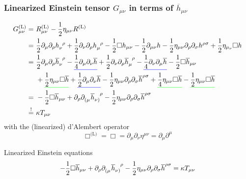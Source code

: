 \subsubsection{Linearized Einstein tensor \texorpdfstring{$G_{\mu\nu}$}{Gmunu} in terms of \texorpdfstring{$\overline{h}_{\mu\nu}$}{hbarmunu}}

\begin{equation}
    \begin{split}
        G_{\mu\nu}^{\text{(L)}} =\ & R_{\mu\nu}^{\text{(L)}} - \frac{1}{2} \eta_{\mu\nu} R^{\text{(L)}} \\
        =\ & \frac{1}{2} \partial_\mu \partial_\rho \tensor{h}{_\nu^\rho} + \frac{1}{2} \partial_\nu \partial_\rho \tensor{h}{_\mu^\rho}
        - \frac{1}{2} \Box h_{\mu\nu} - \frac{1}{2} \partial_{\mu\nu}h-\frac{1}{2} \eta_{\mu\nu}\partial_\rho\partial_\sigma h^{\rho\sigma}
        + \frac{1}{2} \eta_{\mu_\nu}\Box h \\
        =\ & \frac{1}{2} \partial_\mu\partial_\rho \tensor{\overline{h}}{_\nu^\rho}
        - \mathunderline{blue}{\frac{1}{4}\partial_\mu\partial_\nu\overline{h}}
        + \frac{1}{2} \partial_\nu\partial_\rho\tensor{\overline{h}}{_\mu^\rho}
        - \mathunderline{blue}{\frac{1}{4}\partial_\nu\partial_\mu\overline{h}} - \frac{1}{2}\Box\overline{h}_{\mu\nu} \\
        & + \mathunderline{green}{\frac{1}{2}\eta_{\mu\nu}\Box\overline{h}} + \mathunderline{blue}{\frac{1}{2}\partial_\mu\partial_\nu\overline{h}}
        - \frac{1}{2}\eta_{\mu\nu}\partial_\rho\partial_\sigma\overline{h}^{\rho\sigma}
        + \mathunderline{green}{\frac{1}{4}\eta_{\mu\nu}\Box\overline{h}} - \mathunderline{green}{\frac{1}{2}\eta_{\mu\nu}\Box\overline{h}} \\
        =\ & -\frac{1}{2} \Box \overline{h}_{\mu\nu} + \partial_\rho \tensor{\partial}{_(_\mu}\tensor{\overline{h}}{_\nu_)^\rho}
        - \frac{1}{2} \eta_{\mu\nu}\partial_\rho\partial_\sigma \overline{h}^{\rho\sigma} \\
        \overset{!}{=}\ & \kappa T_{\mu\nu}
    \end{split}
\end{equation} %
with the (linearized) d'Alembert operator
\begin{equation}
    \Box^{\text{(L)}} = \Box = \partial_\mu\partial_\nu \eta^{\mu\nu}=\partial_\mu\partial^\mu
\end{equation}
\begin{definition}{Linearized Einstein equations}
    \begin{equation}
        \label{eq:lineinsteineqs}
        -\frac{1}{2} \Box \overline{h}_{\mu\nu} + \partial_\rho \tensor{\partial}{_(_\mu}\tensor{\overline{h}}{_\nu_)^\rho}
        - \frac{1}{2} \eta_{\mu\nu}\partial_\rho\partial_\sigma \overline{h}^{\rho\sigma} = \kappa T_{\mu\nu}
    \end{equation}
\end{definition}

